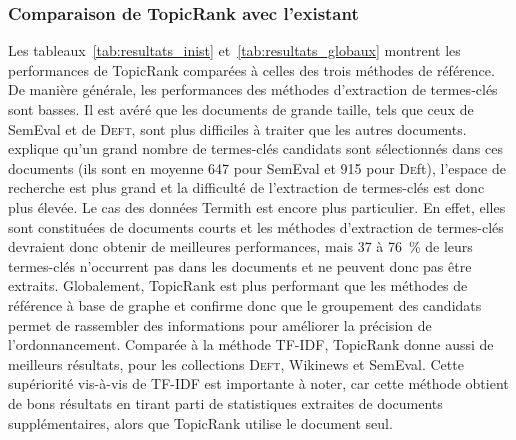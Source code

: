       \subsubsection{Comparaison de TopicRank avec l'existant}
      \label{subsubsec:main:domain_independent_keyphrase_extraction-unsupervised_automatic_keyphrase_extraction-evaluation-comparison}
        Les tableaux~\ref{tab:resultats_inist} et~\ref{tab:resultats_globaux}
        montrent les performances de TopicRank comparées à celles des trois
        méthodes de référence. De manière générale, les performances des
        méthodes d'extraction de termes-clés sont basses. Il est avéré que les
        documents de grande taille, tels que ceux de SemEval et de
        \textsc{Deft}, sont plus difficiles à traiter que les autres documents.
         explique qu'un grand nombre de
        termes-clés candidats sont sélectionnés dans ces documents (ils sont en
        moyenne 647 pour SemEval et 915 pour \textsc{De}ft), l'espace de
        recherche est plus grand et la difficulté de l'extraction de termes-clés
        est donc plus élevée. Le cas des données Termith
        est encore plus particulier. En effet, elles sont constituées de
        documents courts et les méthodes d'extraction de termes-clés devraient
        donc obtenir de meilleures performances, mais 37 à 76~\% de leurs
        termes-clés n'occurrent pas dans les documents et ne peuvent donc pas
        être extraits.
        Globalement, TopicRank est plus performant que les méthodes de référence
        à base de graphe et confirme donc que le groupement des candidats
        permet de rassembler des informations pour améliorer la précision de
        l'ordonnancement.
        Comparée à la méthode TF-IDF, TopicRank donne aussi de meilleurs
        résultats, pour les collections \textsc{Deft}, Wikinews et SemEval.
        Cette supériorité vis-à-vis de TF-IDF est importante à noter, car cette
        méthode obtient de bons résultats en tirant parti de statistiques
        extraites de documents supplémentaires, alors que TopicRank utilise le
        document seul.
